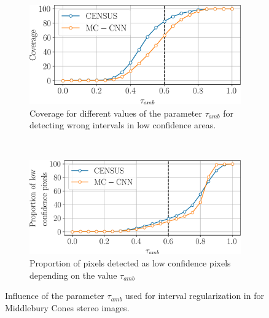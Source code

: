 \begin{figure}
    \centering
    \begin{subfigure}[t]{0.7\linewidth}
        \centering
        \includegraphics[width=\linewidth]{Images/X_Annex/ablation_study_cones_tau_amb.png}
        \caption{Coverage for different values of the parameter $\tau_{amb}$ for detecting wrong intervals in low confidence areas.}
        \label{fig:ablation_study_tau_coverage}
    \end{subfigure}\vspace*{0.3cm}\\
    \begin{subfigure}[t]{0.7\linewidth}
        \centering
        \includegraphics[width=\linewidth]{Images/X_Annex/ablation_study_cones_tau_amb_2.png}
        \caption{Proportion of pixels detected as low confidence pixels depending on the value $\tau_{amb}$}
        \label{fig:ablation_study_tau_size}
    \end{subfigure}
    \caption{Influence of the parameter $\tau_{amb}$ used for interval regularization in  for Middlebury Cones stereo images.}
    \label{fig:ablation_study_tau}
\end{figure}

